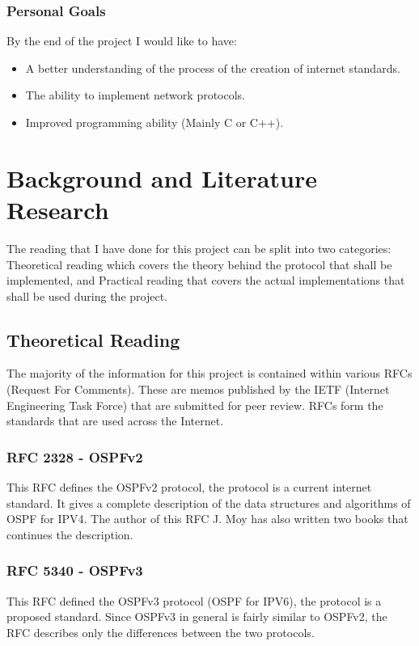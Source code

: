 \documentclass[12pt]{report}
\begin{document}
\subsection{Personal Goals}
By the end of the project I would like to have:

\begin{itemize}
	\item A better understanding of the process of the creation of internet standards.
	\item The ability to implement network protocols. 
	\item Improved programming ability (Mainly C or C++).
\end{itemize}

\chapter{Background and Literature Research}

The reading that I have done for this project can be split into two categories: Theoretical
reading which covers the theory behind the protocol that shall be implemented,
and Practical reading that covers the actual implementations that shall be used
during the project.

\section{Theoretical Reading}
The majority of the information for this project is contained within various
RFCs (Request For Comments).  These are memos published by the IETF (Internet
Engineering Task Force) that are submitted for peer review.  RFCs form the
standards that are used across the Internet.

	\subsection{RFC 2328 - OSPFv2} 
	This RFC defines the OSPFv2 protocol, the protocol is a current 
	internet standard. 
	It gives a complete description of the data structures and algorithms
	of OSPF for IPV4. 
	The author of this RFC J. Moy has also written two books that 
	continues the description. 

	\subsection{RFC 5340 - OSPFv3}
	This RFC defined the OSPFv3 protocol (OSPF for IPV6), the protocol is a
	proposed standard.  Since OSPFv3 in general is fairly similar to OSPFv2,
	the RFC describes only the differences between the two protocols. 
\end{document}
